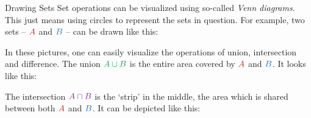 \documentclass[final]{beamer}
\newlength{\colwidth}
\newcommand{\clr}{\textcolor{BrickRed}}
\newcommand{\clb}{\textcolor{RoyalBlue}}
\newcommand{\clg}{\textcolor{ForestGreen}}
\newcommand{\clm}{\textcolor{Fuchsia}}
\begin{document}
\begin{frame}[t]
\begin{columns}[t]
    \begin{column}{\colwidth}
      \begin{block}{Drawing Sets}
        Set operations can be visualized using so-called \emph{Venn
        diagrams}. This
        just means using circles to represent the sets in question.
        For example, two
        sets -- $\clr{A}$ and $\clb{B}$ -- can be drawn like this:
        \begin{center}
        \end{center}
        In these pictures, one can easily visualize the operations of union,
        intersection and difference. The union $\clg{A \cup B}$ is the entire
        area covered by $\clr{A}$ and $\clb{B}$. It looks like this:
        \begin{center}
        \end{center}
        The intersection $\clm{A \cap B}$ is the `strip' in the
        middle, the area which
        is shared between both $\clr{A}$ and $\clb{B}$. It can be
        depicted like this:
        \begin{center}
\end{center}
\end{block}
\end{column}
\end{columns}
\end{frame}
\end{document}
